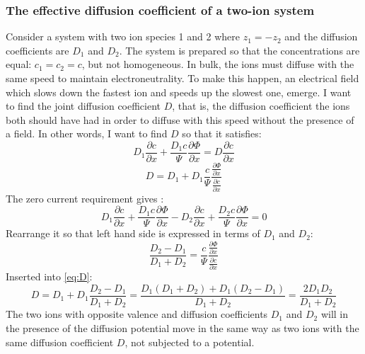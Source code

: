 \documentclass{article}
\begin{document}
\subsubsection{The effective diffusion coefficient of a two-ion system}\label{joint diffusion}
Consider  a system with two ion species 1 and 2 where $z_1 = -z_2$ and the diffusion coefficients are $D_1$ and $D_2$. The system is prepared so that the concentrations are equal: $c_1 = c_2=c$, but not homogeneous. In bulk, the ions must diffuse with the same speed to maintain electroneutrality. To make this happen, an electrical field which slows down the fastest ion and speeds up the slowest one, emerge.  I want to find the joint diffusion coefficient $D$, that is, the diffusion coefficient the ions both should have had in order to diffuse with this speed without the presence of a field. In other words, I want to find $D$ so that it satisfies:
\begin{equation}
D_1 \frac{\partial c}{\partial x} + \frac{D_1 c}{\Psi}\frac{\partial \Phi}{\partial x} = D\frac{\partial c}{\partial x}
\end{equation} 
\begin{equation}\label{eq:D}
D = D_1 + D_1 \frac{c}{\Psi}\frac{\frac{\partial \Phi}{\partial x}}{\frac{\partial c}{\partial x}}
\end{equation}
The zero current requirement gives :
\begin{equation}
D_1 \frac{\partial c}{\partial x} + \frac{D_1 c}{\Psi}\frac{\partial \Phi}{\partial x} - D_2 \frac{\partial c}{\partial x} + \frac{D_2 c}{\Psi}\frac{\partial \Phi}{\partial x} = 0
\end{equation}
Rearrange it so that left hand side is expressed in terms of $D_1$ and $D_2$:
\begin{equation}
\frac{D_2 - D_1}{D_1 + D_2} = \frac{c}{\Psi}\frac{\frac{\partial \Phi}{\partial x}}{\frac{\partial c}{\partial x}}
\end{equation}
Inserted into \ref{eq:D}: 
\begin{equation}
D = D_1 +D_1 \frac{D_2 - D_1}{D_1 + D_2} = \frac{D_1(D_1 + D_2)+D_1(D_2-D_1)}{D_1+D_2} = \frac{2D_1D_2}{D_1+D_2}
\end{equation}
The two ions with opposite valence and diffusion coefficients $D_1$ and $D_2$ will in the presence of the diffusion potential move in the same way as two ions with the same diffusion coefficient $D$, not subjected to a potential. 
\end{document}
